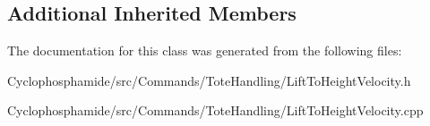 \subsection*{Additional Inherited Members}


The documentation for this class was generated from the following files\+:\begin{DoxyCompactItemize}
\item 
Cyclophosphamide/src/\+Commands/\+Tote\+Handling/Lift\+To\+Height\+Velocity.\+h\item 
Cyclophosphamide/src/\+Commands/\+Tote\+Handling/Lift\+To\+Height\+Velocity.\+cpp\end{DoxyCompactItemize}

